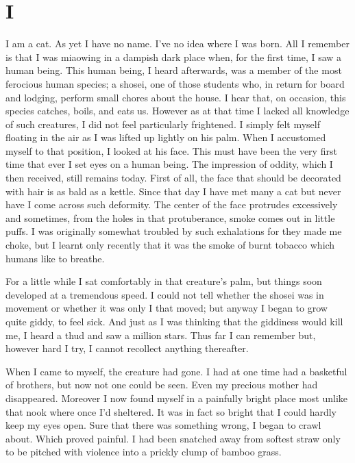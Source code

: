 \documentclass{book}
\begin{document}
\chapter*{I}
I am a cat. As yet I have no name. I've no idea where I was born. All I
remember is that I was miaowing in a dampish dark place when, for the
first time, I saw a human being. This human being, I heard afterwards,
was a member of the most ferocious human species; a shosei, one of those
students who, in return for board and lodging, perform small chores
about the house. I hear that, on occasion, this species catches, boils,
and eats us. However as at that time I lacked all knowledge of such
creatures, I did not feel particularly frightened. I simply felt myself
floating in the air as I was lifted up lightly on his palm. When I
accustomed myself to that position, I looked at his face. This must have
been the very first time that ever I set eyes on a human being. The
impression of oddity, which I then received, still remains today. First
of all, the face that should be decorated with hair is as bald as a
kettle. Since that day I have met many a cat but never have I come
across such deformity. The center of the face protrudes excessively and
sometimes, from the holes in that protuberance, smoke comes out in
little puffs. I was originally somewhat troubled by such exhalations for
they made me choke, but I learnt only recently that it was the smoke of
burnt tobacco which humans like to breathe.

For a little while I sat comfortably in that creature's palm, but things
soon developed at a tremendous speed. I could not tell whether the
shosei was in movement or whether it was only I that moved; but anyway I
began to grow quite giddy, to feel sick. And just as I was thinking that
the giddiness would kill me, I heard a thud and saw a million stars.
Thus far I can remember but, however hard I try, I cannot recollect
anything thereafter.

When I came to myself, the creature had gone. I had at one time had a
basketful of brothers, but now not one could be seen. Even my precious
mother had disappeared. Moreover I now found myself in a painfully
bright place most unlike that nook where once I'd sheltered. It was in
fact so bright that I could hardly keep my eyes open. Sure that there
was something wrong, I began to crawl about. Which proved painful. I had
been snatched away from softest straw only to be pitched with violence
into a prickly clump of bamboo grass.
\end{document}
